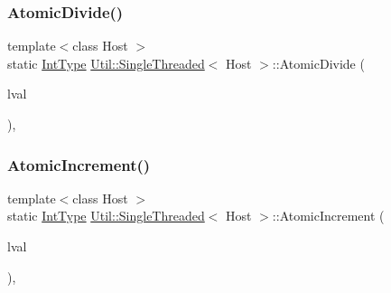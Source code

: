 \mbox{\label{classUtil_1_1SingleThreaded_afb0bc74b0e21b32b31c4895fa22a3337}} 
\subsubsection{\texorpdfstring{AtomicDivide()}{AtomicDivide()}\hspace{0.1cm}{\footnotesize\ttfamily [6/6]}}
{\footnotesize\ttfamily template$<$class Host $>$ \\
static \mbox{\hyperlink{classUtil_1_1SingleThreaded_a35932213fb0c15a7b67ced79bc2af4c6}{Int\+Type}} \mbox{\hyperlink{classUtil_1_1SingleThreaded}{Util\+::\+Single\+Threaded}}$<$ Host $>$\+::Atomic\+Divide (\begin{DoxyParamCaption}\item[{volatile \mbox{\hyperlink{classUtil_1_1SingleThreaded_a35932213fb0c15a7b67ced79bc2af4c6}{Int\+Type}} \&}]{lval }\end{DoxyParamCaption})\hspace{0.3cm}{\ttfamily [inline]}, {\ttfamily [static]}}

\mbox{\label{classUtil_1_1SingleThreaded_a72d41f77da5c6174b1ffb08cb21f1c39}} 
\subsubsection{\texorpdfstring{AtomicIncrement()}{AtomicIncrement()}\hspace{0.1cm}{\footnotesize\ttfamily [1/3]}}
{\footnotesize\ttfamily template$<$class Host $>$ \\
static \mbox{\hyperlink{classUtil_1_1SingleThreaded_a35932213fb0c15a7b67ced79bc2af4c6}{Int\+Type}} \mbox{\hyperlink{classUtil_1_1SingleThreaded}{Util\+::\+Single\+Threaded}}$<$ Host $>$\+::Atomic\+Increment (\begin{DoxyParamCaption}\item[{volatile \mbox{\hyperlink{classUtil_1_1SingleThreaded_a35932213fb0c15a7b67ced79bc2af4c6}{Int\+Type}} \&}]{lval }\end{DoxyParamCaption})\hspace{0.3cm}{\ttfamily [inline]}, {\ttfamily [static]}}

